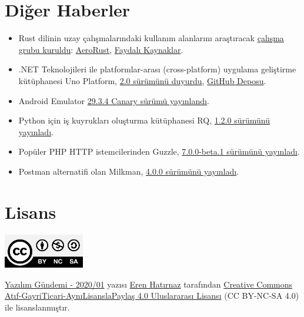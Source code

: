 \documentclass[11pt]{article}
\begin{document}
\section{Diğer Haberler}
\label{sec:orga0a2d67}
\begin{itemize}
\item Rust dilinin uzay çalışmalarındaki kullanım alanlarını araştıracak \href{https://www.reddit.com/r/rust/comments/ejdv7w/announcing\_aerorust\_the\_unofficial\_working\_group/}{çalışma
grubu kuruldu}: \href{https://github.com/AeroRust/Welcome}{AeroRust}, \href{https://github.com/AeroRust/awesome-space}{Faydalı Kaynaklar}.
\item .NET Teknolojileri ile platformlar-arası (cross-platform) uygulama geliştirme
kütüphanesi Uno Platform, \href{https://platform.uno/uno-platform-2-0-reloaded-general-availability-hot-reload-and-more/}{2.0 sürümünü duyurdu}, \href{https://github.com/unoplatform/uno}{GitHub Deposu}.
\item Android Emulator \href{https://androidstudio.googleblog.com/2020/01/emulator-2934-canary.html}{29.3.4 Canary sürümü yayınlandı}.
\item Python için iş kuyrukları oluşturma kütüphanesi RQ, \href{https://github.com/rq/rq/releases/tag/v1.2.0}{1.2.0 sürümünü yayınladı}.
\item Popüler PHP HTTP istemcilerinden Guzzle, \href{https://github.com/guzzle/guzzle/releases/tag/7.0.0-beta.1}{7.0.0-beta.1 sürümünü yayınladı}.
\item Postman alternatifi olan Milkman, \href{https://github.com/warmuuh/milkman/releases/tag/4.0.0}{4.0.0 sürümünü yayınladı}.
\end{itemize}
\section{Lisans}
\label{sec:org32d118a}
\begin{center}
\begin{center}
\includegraphics[height=1.5cm]{../../../img/CC_BY-NC-SA_4.0.png}
\end{center}

\href{yazilim-gundemi-2020-01.pdf}{Yazılım Gündemi - 2020/01} yazısı \href{https://erenhatirnaz.github.io}{Eren Hatırnaz} tarafından \href{http://creativecommons.org/licenses/by-nc-sa/4.0/}{Creative Commons
Atıf-GayriTicari-AynıLisanslaPaylaş 4.0 Uluslararası Lisansı} (CC BY-NC-SA 4.0)
ile lisanslanmıştır.
\end{center}
\end{document}
